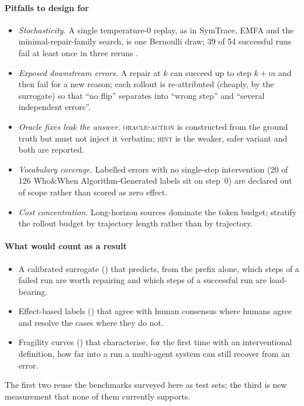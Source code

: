 \paragraph{Pitfalls to design for}
\begin{itemize}[leftmargin=1.1em]
\item \emph{Stochasticity.} A single temperature-0 replay, as in SymTrace, EMFA and the minimal-repair-family search, is one Bernoulli draw; 39 of 54 successful runs fail at least once in three reruns \cite{luan2026symtrace}.
\item \emph{Exposed downstream errors.} A repair at $k$ can succeed up to step $k+m$ and then fail for a new reason; each rollout is re-attributed (cheaply, by the surrogate) so that ``no flip'' separates into ``wrong step'' and ``several independent errors''.
\item \emph{Oracle fixes leak the answer.} \textsc{oracle-action} is constructed from the ground truth but must not inject it verbatim; \textsc{hint} is the weaker, safer variant and both are reported.
\item \emph{Vocabulary coverage.} Labelled errors with no single-step intervention (20 of 126 Who\&When Algorithm-Generated labels sit on step~0) are declared out of scope rather than scored as zero effect.
\item \emph{Cost concentration.} Long-horizon sources dominate the token budget; stratify the rollout budget by trajectory length rather than by trajectory.
\end{itemize}

\paragraph{What would count as a result}
\begin{itemize}[leftmargin=1.1em]
\item A calibrated surrogate () that predicts, from the prefix alone, which steps of a failed run are worth repairing and which steps of a successful run are load-bearing.
\item Effect-based labels () that agree with human consensus where humans agree and resolve the cases where they do not.
\item Fragility curves () that characterise, for the first time with an interventional definition, how far into a run a multi-agent system can still recover from an error.
\end{itemize}
The first two reuse the benchmarks surveyed here as test sets; the third is new measurement that none of them currently supports.
